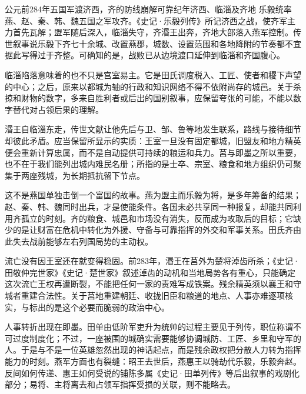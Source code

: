 \begin{event}{公元前284年}{五国军渡济西，齐的防线崩解}{可靠纪年}{济西、临淄及齐地}
乐毅统率燕、赵、秦、韩、魏五国之军攻齐。《史记·乐毅列传》所记济西之战，使齐军主力首先瓦解；盟军随后深入，临淄失守，齐湣王出奔，齐地大部落入燕军控制。传世叙事说乐毅下齐七十余城、改置燕郡，城数、设置范围和各地降附的节奏都不宜据此写得过于齐整。可确知的是，战败已从边境渡口延伸到临淄和齐国腹心。

临淄陷落意味着的也不只是宫室易主。它是田氏调度税入、工匠、使者和稷下声望的中心；之后，原来以都城为轴的行政和知识网络不得不依附尚存的城邑。关于杀掠和财物的数字，多来自胜利者或后出的国别叙事，应保留夸张的可能，不能以数字替代对占领后果的理解。

湣王自临淄东走，传世文献让他先后与卫、邹、鲁等地发生联系，路线与接待细节却彼此矛盾。应当保留所显示的实质：王室一旦没有固定都城，旧盟友和地方精英便会重新计算忠属，而不是自动提供可持续的粮运和兵力。莒与即墨之所以重要，也不在于我们能列出城内难民名册；所指的是士卒、宗室、粮食和地方组织仍可聚集于两座残城，为长期抵抗留下节点。

这不是燕国单独击倒一个富国的故事。燕为盟主而乐毅为将，是多年筹备的结果；赵、秦、韩、魏同时出兵，才是使能条件。各国未必共享同一种报复，却能共同利用齐孤立的时刻。齐的粮食、城邑和市场没有消失，反而成为攻取后的目标；它缺少的是让财富在危机中转化为外援、守备与可靠指挥的外交和军事关系。田氏齐由此失去战前能够左右列国局势的主动权。
\end{event}

流亡没有因王室还在就变得稳固。前283年，湣王在莒外为楚将淖齿所杀；《史记·田敬仲完世家》《史记·楚世家》叙述淖齿的动机和当地局势各有重心，只能确定这次流亡王权再遭断裂，不能把任何一家的责难写成铁案。残余精英须以襄王和守城者重建合法性。关于莒地重建朝廷、收拢旧臣和粮道的地点、人事亦难逐项核实，与标出的是这个必要而脆弱的政治中心。

人事转折出现在即墨。田单由低阶军吏升为统帅的过程主要见于列传，职位称谓不可过度制度化；不过，一座被围的城确实需要能够协调城防、工匠、乡里和守军的人。于是与不是一位英雄忽然出现的神话起点，而是残余政权把分散人力转为指挥能力的时刻。燕军方面也有裂缝：昭王去世后，燕惠王以骑劫代乐毅，乐毅奔赵。反间如何传递、惠王如何受说的铺陈多属《史记·田单列传》等后出叙事的戏剧化部分；易将、主将离去和占领军指挥受损的关联，则不能略去。

